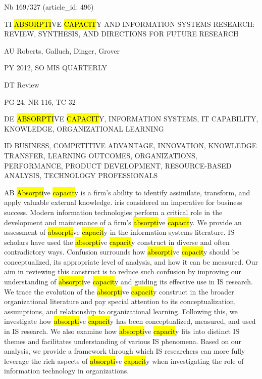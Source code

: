 \documentclass[a4paper]{article}
\begin{document}
\vspace*{-2cm}
Nb \tabto{0cm}169/327 (article\_id: 496)\par
TI \tabto{0cm}\hl{ABSORPTI}VE \hl{CAPACIT}Y AND INFORMATION SYSTEMS RESEARCH: REVIEW, SYNTHESIS, AND DIRECTIONS FOR FUTURE RESEARCH\par
AU \tabto{0cm}Roberts, Galluch, Dinger, Grover\par
PY \tabto{0cm}2012, SO MIS QUARTERLY\par
DT \tabto{0cm}Review\par
PG \tabto{0cm}24, NR 116, TC 32\par
DE \tabto{0cm}\hl{ABSORPTI}VE \hl{CAPACIT}Y, INFORMATION SYSTEMS, IT CAPABILITY, KNOWLEDGE, ORGANIZATIONAL LEARNING\par
ID \tabto{0cm}BUSINESS, COMPETITIVE ADVANTAGE, INNOVATION, KNOWLEDGE TRANSFER, LEARNING OUTCOMES, ORGANIZATIONS, PERFORMANCE, PRODUCT DEVELOPMENT, RESOURCE-BASED ANALYSIS, TECHNOLOGY PROFESSIONALS\par
AB \tabto{0cm}\hl{Absorpti}ve \hl{capacit}y is a firm's ability to identify assimilate, transform, and apply valuable external knowledge. iris considered an imperative for business success. Modern information technologies perform a critical role in the development and maintenance of a firm's \hl{absorpti}ve \hl{capacit}y. We provide an assessment of \hl{absorpti}ve \hl{capacit}y in the information systems literature. IS scholars have used the \hl{absorpti}ve \hl{capacit}y construct in diverse and often contradictory ways. Confusion surrounds how \hl{absorpti}ve \hl{capacit}y should be conceptualized, its appropriate level of analysis, and how it can be measured. Our aim in reviewing this construct is to reduce such confusion by improving our understanding of \hl{absorpti}ve \hl{capacit}y and guiding its effective use in IS research. We trace the evolution of the \hl{absorpti}ve \hl{capacit}y construct in the broader organizational literature and pay special attention to its conceptualization, assumptions, and relationship to organizational learning. Following this, we investigate how \hl{absorpti}ve \hl{capacit}y has been conceptualized, measured, and used in IS research. We also examine how \hl{absorpti}ve \hl{capacit}y fits into distinct IS themes and facilitates understanding of various IS phenomena. Based on our analysis, we provide a framework through which IS researchers can more fully leverage the rich aspects of \hl{absorpti}ve \hl{capacit}y when investigating the role of information technology in organizations.\par
\clearpage
\end{document}
